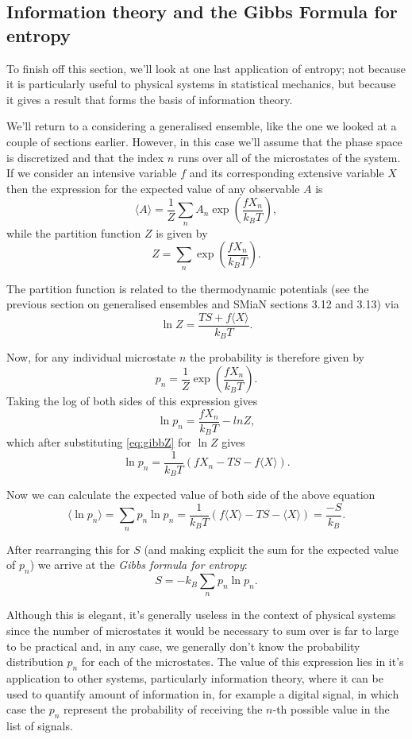 \documentclass{article}
\begin{document}
\subsection{Information theory and the Gibbs Formula for entropy}
To finish off this section, we'll look at one last application of entropy; not because it is particularly useful to physical systems in statistical mechanics, but because it gives a result that forms the basis of information theory.

We'll return to a considering a generalised ensemble, like the one we looked at a couple of sections earlier. However, in this case we'll assume that the phase space is discretized and that the index $n$ runs over all of the microstates of the system. If we consider an intensive variable $f$ and its corresponding extensive variable $X$ then the expression for the expected value of any observable $A$ is
$$
	\langle A \rangle = \frac{1}{Z}\sum_n A_n\exp\left(\frac{fX_n}{k_BT}\right),
$$
while the partition function $Z$ is given by
$$
	Z =\sum_n\exp\left(\frac{fX_n}{k_BT}\right).
$$

The partition function is related to the thermodynamic potentials (see the previous section on generalised ensembles and SMiaN sections 3.12 and 3.13) via
\begin{equation}
	\ln Z = \frac{TS+f\langle X\rangle}{k_BT}.
	\label{eq:gibbZ}
\end{equation}

Now, for any individual microstate $n$ the probability is therefore given by
$$
	p_n = \frac{1}{Z}\exp\left(\frac{fX_n}{k_BT}\right).
$$
Taking the log of both sides of this expression gives
$$
	\ln p_n = \frac{fX_n}{k_BT} - ln Z,
$$
which after substituting \ref{eq:gibbZ} for $\ln Z$ gives
$$
	\ln p_n = \frac{1}{k_BT}(fX_n -TS -f\langle X\rangle).
$$

Now we can calculate the expected value of both side of the above equation
$$
	\langle \ln p_n \rangle = \sum_n p_n\ln p_n = \frac{1}{k_BT}(f\langle X\rangle -TS -\langle X \rangle) = \frac{-S}{k_B}.
$$

After rearranging this for $S$ (and making explicit the sum for the expected value of $p_n$) we arrive at the \emph{Gibbs formula for entropy}:
$$
	S = -k_B\sum_np_n\ln p_n.
$$

Although this is elegant, it's generally useless in the context of physical systems since the number of microstates it would be necessary to sum over is far to large to be practical and, in any case, we generally don't know the probability distribution $p_n$ for each of the microstates. The value of this expression lies in it's application to other systems, particularly information theory, where it can be used to quantify amount of information in, for example a digital signal, in which case the $p_n$ represent the probability of receiving the $n$-th possible value in the list of signals.
\end{document}
